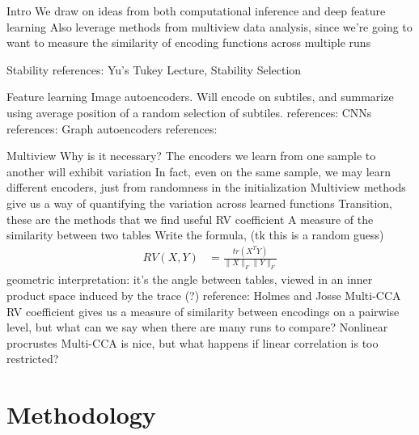 \documentclass[11pt]{article}
\begin{document}
\begin{outline}
\1 Intro
  \2 We draw on ideas from both computational inference and deep feature
  learning
  \2 Also leverage methods from multiview data analysis, since we're going to
  want to measure the similarity of encoding functions across multiple runs

\1 Stability
  \2 references: Yu's Tukey Lecture, Stability Selection

\1 Feature learning
  \2 Image autoencoders. Will encode on subtiles, and summarize using average
  position of a random selection of subtiles.
    \3 references:
  \2 CNNs
    \3 references:
  \2 Graph autoencoders
    \3 references:

\1 Multiview
  \2 Why is it necessary?
    \3 The encoders we learn from one sample to another will exhibit variation
      \4 In fact, even on the same sample, we may learn different encoders, just
      from randomness in the initialization
    \3 Multiview methods give us a way of quantifying the variation across
    learned functions
  \2 Transition, these are the methods that we find useful
  \2 RV coefficient
    \3 A measure of the similarity between two tables
    \3 Write the formula, (tk this is a random guess)
    \begin{align}
      RV\left(X, Y\right) &= \frac{tr\left(X^T Y\right)}{\|X\|_{F}\|Y\|_{F}}
    \end{align}
    \3 geometric interpretation: it's the angle between tables, viewed in an
    inner product space induced by the trace (?)
    \3 reference: Holmes and Josse
  \2 Multi-CCA
    \3 RV coefficient gives us a measure of similarity between encodings on a
    pairwise level, but what can we say when there are many runs to compare?
  \2 Nonlinear procrustes
    \3 Multi-CCA is nice, but what happens if linear correlation is too
    restricted?
\end{outline}

\section{Methodology}
\end{document}
